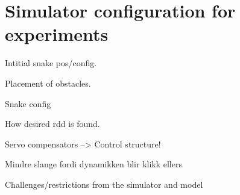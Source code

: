 \section{Simulator configuration for experiments}

Intitial snake pos/config.

Placement of obstacles.

Snake config

How desired rdd is found.

Servo compensators --> Control structure!

Mindre slange fordi dynamikken blir klikk ellers

Challenges/restrictions from the simulator and model